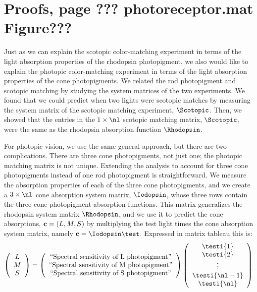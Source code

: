 


\doublesp

\section*{Proofs, page ??? photoreceptor.mat Figure???}

Just as we can explain the scotopic color-matching experiment in terms
of the light absorption properties of the rhodopsin photopigment, we
also would like to explain the photopic color-matching experiment in
terms of the light absorption properties of the cone photopigments.
We related the rod photopigment and scotopic matching by studying the
system matrices of the two experiments.  We found that we could
predict when two lights were scotopic matches by measuring the system
matrix of the scotopic matching experiment, $\Scotopic$.  Then, we
showed that the entries in the $1 \times \nl$ scotopic matching
matrix, $\Scotopic$, were the same as the rhodopsin absorption
function $\Rhodopsin$.

For photopic vision, we use the same general approach, but there are
two complications.  There are three cone photopigments, not just one;
the photopic matching matrix is not unique.  Extending the analysis to
account for three cone photopigments instead of one rod photopigment
is straightforward.  We measure the absorption properties of each of
the three cone photopigments, and we create a $3 \times \nl$ cone
absorption system matrix, $\Iodopsin$, whose three rows contain the
three cone photopigment absorption functions.  This matrix generalizes
the rhodopsin system matrix $\Rhodopsin$, and we use it to predict the
cone absorptions, ${\bf c} = (L,M,S)$ by multiplying the test light
times the cone absorption system matrix, namely ${\bf c} = \Iodopsin
\test$. Expressed in matrix tableau this is:
\begin{equation}
  \left ( 
   \begin{array}{c}
    L \\
    M \\
    S \\
   \end{array}
   \right ) =
  \left ( 
   \begin{array}{c}
     \mbox{``Spectral sensitivity of L photopigment''} \\
     \mbox{``Spectral sensitivity of M photopigment''} \\
     \mbox{``Spectral sensitivity of S photopigment''} \\
   \end{array}
  \right )
  \left (
   \begin{array}{c}
    \testi{1} \\
    \testi{2} \\
    \vdots \\
    \testi{\nl-1} \\
    \testi{\nl} \\
   \end{array}
  \right )
\end{equation}


